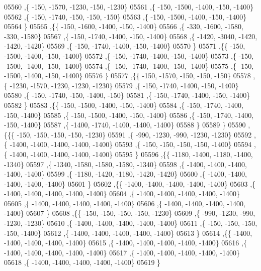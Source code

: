 \begin{DoxyCode}
05560     ,\{  -150, -1570, -1230,  -150, -1230\}
05561     ,\{  -150, -1500, -1400,  -150, -1400\}
05562     ,\{  -150, -1740,  -150,  -150,  -150\}
05563     ,\{  -150, -1500, -1400,  -150, -1400\}
05564     \}
05565    ,\{\{  -150, -1600, -1400,  -150, -1400\}
05566     ,\{  -330, -1600, -1580,  -330, -1580\}
05567     ,\{  -150, -1740, -1400,  -150, -1400\}
05568     ,\{ -1420, -3040, -1420, -1420, -1420\}
05569     ,\{  -150, -1740, -1400,  -150, -1400\}
05570     \}
05571    ,\{\{  -150, -1500, -1400,  -150, -1400\}
05572     ,\{  -150, -1740, -1400,  -150, -1400\}
05573     ,\{  -150, -1500, -1400,  -150, -1400\}
05574     ,\{  -150, -1740, -1400,  -150, -1400\}
05575     ,\{  -150, -1500, -1400,  -150, -1400\}
05576     \}
05577    ,\{\{  -150, -1570,  -150,  -150,  -150\}
05578     ,\{ -1230, -1570, -1230, -1230, -1230\}
05579     ,\{  -150, -1740, -1400,  -150, -1400\}
05580     ,\{  -150, -1740,  -150, -1400,  -150\}
05581     ,\{  -150, -1740, -1400,  -150, -1400\}
05582     \}
05583    ,\{\{  -150, -1500, -1400,  -150, -1400\}
05584     ,\{  -150, -1740, -1400,  -150, -1400\}
05585     ,\{  -150, -1500, -1400,  -150, -1400\}
05586     ,\{  -150, -1740, -1400,  -150, -1400\}
05587     ,\{ -1400, -1740, -1400, -1400, -1400\}
05588     \}
05589    \}
05590   ,\{\{\{  -150,  -150,  -150,  -150, -1230\}
05591     ,\{  -990, -1230,  -990, -1230, -1230\}
05592     ,\{ -1400, -1400, -1400, -1400, -1400\}
05593     ,\{  -150,  -150,  -150,  -150, -1400\}
05594     ,\{ -1400, -1400, -1400, -1400, -1400\}
05595     \}
05596    ,\{\{ -1180, -1400, -1180, -1400, -1340\}
05597     ,\{ -1340, -1580, -1580, -1580, -1340\}
05598     ,\{ -1400, -1400, -1400, -1400, -1400\}
05599     ,\{ -1180, -1420, -1180, -1420, -1420\}
05600     ,\{ -1400, -1400, -1400, -1400, -1400\}
05601     \}
05602    ,\{\{ -1400, -1400, -1400, -1400, -1400\}
05603     ,\{ -1400, -1400, -1400, -1400, -1400\}
05604     ,\{ -1400, -1400, -1400, -1400, -1400\}
05605     ,\{ -1400, -1400, -1400, -1400, -1400\}
05606     ,\{ -1400, -1400, -1400, -1400, -1400\}
05607     \}
05608    ,\{\{  -150,  -150,  -150,  -150, -1230\}
05609     ,\{  -990, -1230,  -990, -1230, -1230\}
05610     ,\{ -1400, -1400, -1400, -1400, -1400\}
05611     ,\{  -150,  -150,  -150,  -150, -1400\}
05612     ,\{ -1400, -1400, -1400, -1400, -1400\}
05613     \}
05614    ,\{\{ -1400, -1400, -1400, -1400, -1400\}
05615     ,\{ -1400, -1400, -1400, -1400, -1400\}
05616     ,\{ -1400, -1400, -1400, -1400, -1400\}
05617     ,\{ -1400, -1400, -1400, -1400, -1400\}
05618     ,\{ -1400, -1400, -1400, -1400, -1400\}
05619     \}

\end{DoxyCode}
